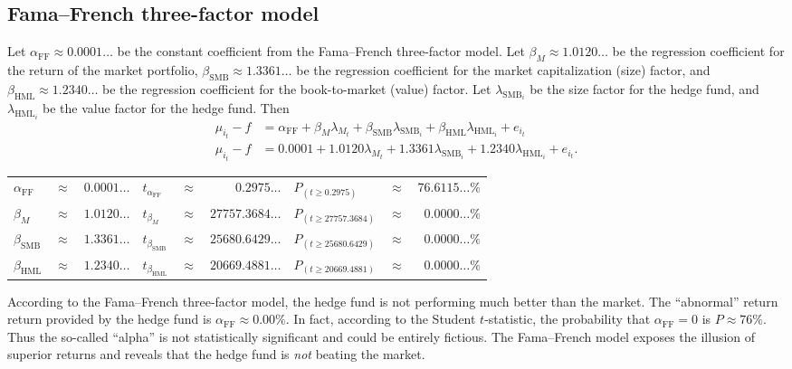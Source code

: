 \documentclass[12pt]{article}
\begin{document}
\subsection{Fama--French three-factor model}
Let $\alpha_{\mathrm{FF}}\approx 0.0001\dots$ be the constant coefficient from the Fama--French three-factor model. Let $\beta_M\approx 1.0120\dots$ be the regression coefficient for the return of the market portfolio, $\beta_{\mathrm{SMB}}\approx 1.3361\dots$ be the regression coefficient for the market capitalization (size) factor, and $\beta_{\mathrm{HML}}\approx 1.2340\dots$ be the regression coefficient for the book-to-market (value) factor. Let $\lambda_{{{\mathrm{SMB}}_i}}$ be the size factor for the hedge fund, and $\lambda_{{{\mathrm{HML}}_i}}$ be the value factor for the hedge fund. Then
\begin{align*}
\mu_{i_t}-f&=\alpha_{\mathrm{FF}}+\beta_M\lambda_{M_t}+\beta_{\mathrm{SMB}}\lambda_{{{\mathrm{SMB}}_i}}+\beta_{\mathrm{HML}}\lambda_{{{\mathrm{HML}}_i}}+e_{i_t}\\
\mu_{i_t}-f&=0.0001+1.0120\lambda_{M_t}+1.3361\lambda_{{{\mathrm{SMB}}_i}}+1.2340\lambda_{{{\mathrm{HML}}_i}}+e_{i_t}.
\end{align*}
\begin{center}
\begin{tabular}{lcr|lcr|lcr}
$\alpha_{\mathrm{FF}}$&$\approx$&$0.0001\dots$&$t_{\alpha_{\mathrm{FF}}}$&$\approx$&$0.2975\dots$&$P_{(t\geq 0.2975)}$&$\approx$&$76.6115\dots\%$\\
$\beta_M$&$\approx$&$1.0120\dots$&$t_{\beta_M}$&$\approx$&$27757.3684\dots$&$P_{(t\geq 27757.3684)}$&$\approx$&$0.0000\dots\%$\\
$\beta_{\mathrm{SMB}}$&$\approx$&$1.3361\dots$&$t_{\beta_{\mathrm{SMB}}}$&$\approx$&$25680.6429\dots$&$P_{(t\geq 25680.6429)}$&$\approx$&$0.0000\dots\%$\\
$\beta_{\mathrm{HML}}$&$\approx$&$1.2340\dots$&$t_{\beta_{\mathrm{HML}}}$&$\approx$&$20669.4881\dots$&$P_{(t\geq 20669.4881)}$&$\approx$&$0.0000\dots\%$
\end{tabular}
\end{center}
According to the Fama--French three-factor model, the hedge fund is not performing much better than the market. The ``abnormal'' return return provided by the hedge fund is $\alpha_{\mathrm{FF}}\approx 0.00\%$. In fact, according to the Student $t$-statistic, the probability that $\alpha_{\mathrm{FF}}=0$ is $P\approx 76\%$. Thus the so-called ``alpha'' is not statistically significant and could be entirely fictious. The Fama--French model exposes the illusion of superior returns and reveals that the hedge fund is \textit{not} beating the market.
\end{document}
